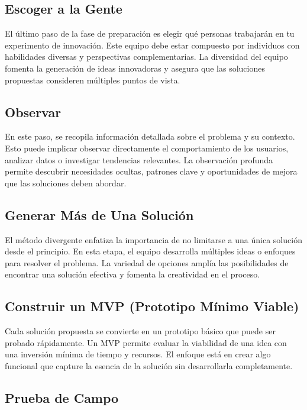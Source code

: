 	\subsection{Escoger a la Gente}

	El último paso de la fase de preparación es elegir qué personas trabajarán en
	tu experimento de innovación. Este equipo debe estar compuesto por individuos
	con habilidades diversas y perspectivas complementarias. La diversidad del
	equipo fomenta la generación de ideas innovadoras y asegura que las soluciones
	propuestas consideren múltiples puntos de vista.

	\subsection{Observar}

	En este paso, se recopila información detallada sobre el problema y su
	contexto. Esto puede implicar observar directamente el comportamiento de los
	usuarios, analizar datos o investigar tendencias relevantes. La observación
	profunda permite descubrir necesidades ocultas, patrones clave y oportunidades
	de mejora que las soluciones deben abordar.

	\subsection{Generar Más de Una Solución}

	El método divergente enfatiza la importancia de no limitarse a una única
	solución desde el principio. En esta etapa, el equipo desarrolla múltiples
	ideas o enfoques para resolver el problema. La variedad de opciones amplía las
	posibilidades de encontrar una solución efectiva y fomenta la creatividad en el
	proceso.

	\subsection{Construir un MVP (Prototipo Mínimo Viable)}

	Cada solución propuesta se convierte en un prototipo básico que puede ser
	probado rápidamente. Un MVP permite evaluar la viabilidad de una idea con una
	inversión mínima de tiempo y recursos. El enfoque está en crear algo funcional
	que capture la esencia de la solución sin desarrollarla completamente.

	\subsection{Prueba de Campo}

